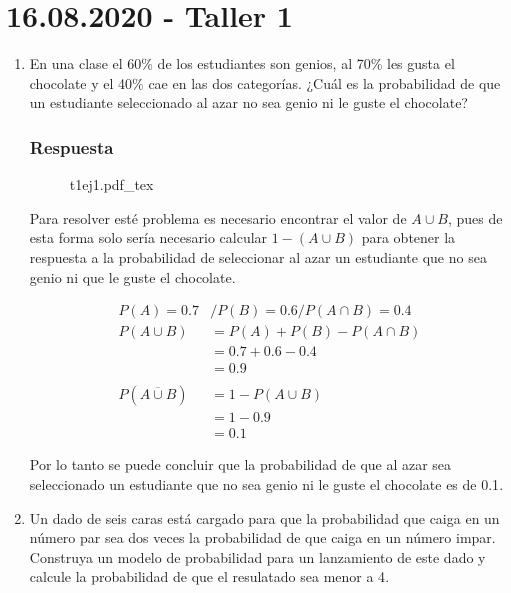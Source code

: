 \documentclass[dvipsnames,a4paper]{book}
\newcommand{\incfig}[2][1]{%
    \def\svgwidth{#1\columnwidth}
    {#2.pdf_tex}
}
\begin{document}
\section{16.08.2020 - Taller 1}
\label{sec:taller_1}

\begin{enumerate}[{Ej1. }]
\item En una clase el {\color{teal} 60\% de los estudiantes son genios}, al
    {\color{brown} 70\% les gusta} el chocolate y el {\color{orange} 40\%
    cae en las dos categorías}. ¿Cuál es la probabilidad de que un
    estudiante seleccionado al azar no sea genio ni le guste el chocolate?

\subsubsection{Respuesta}

\begin{figure}[ht]
    \centering
    \incfig[0.4]{t1ej1}
\end{figure}
Para resolver esté problema es necesario encontrar el valor de \(A\cup B\),
pues de esta forma solo sería necesario calcular \(1-\left(A\cup B\right)\)
para obtener la respuesta a la probabilidad de seleccionar al azar un
estudiante que no sea genio ni que le guste el chocolate.

\begin{align*}
    P\left(A\right)= 0.7&/P\left(B\right)=0.6/P\left(A\cap B\right)=0.4\\
    P\left(A\cup B\right) &= P\left(A\right)+P\left(B\right)-P\left(A\cap B\right)\\
    &=0.7+0.6-0.4\\
    &=0.9\\
    \\
    P\left(\overline{A\cup B}\right) &= 1-P\left(A\cup B\right)\\
    &= 1-0.9\\
    &=0.1
\end{align*}

Por lo tanto se puede concluir que la probabilidad de que al azar sea seleccionado un estudiante que no sea genio ni le guste el chocolate es de {\color{orange} 0.1}.

\item  Un dado de seis caras está cargado para que la probabilidad que caiga
    {\color{OrangeRed} en un número par sea dos veces la probabilidad de que
    caiga en un número impar}. {\color{olive} Construya un modelo de
    probabilidad para un lanzamiento de este dado y calcule la probabilidad de
    que el resulatado sea menor a 4}.


\end{enumerate}
\end{document}
